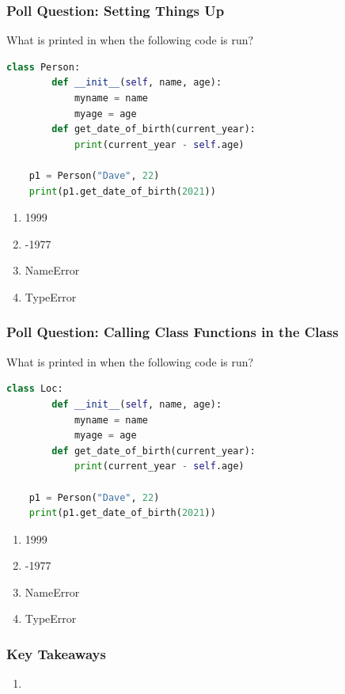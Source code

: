 \documentclass{beamer}
\begin{document}
%
%
\begin{frame}[fragile]
    \frametitle{Poll Question: Setting Things Up}
    What is printed in when the following code is run?
    \begin{lstlisting}[language=Python, autogobble]
    class Person:
        def __init__(self, name, age):
            myname = name
            myage = age
        def get_date_of_birth(current_year):
            print(current_year - self.age)

    p1 = Person("Dave", 22)
    print(p1.get_date_of_birth(2021))
    \end{lstlisting}
    \vfill
    \begin{enumerate}[A]
        \item 1999
        \item -1977
        \item NameError
        \item TypeError
    \end{enumerate}
\end{frame}

%
%
\begin{frame}[fragile]
    \frametitle{Poll Question: Calling Class Functions in the Class}
    What is printed in when the following code is run?
    \begin{lstlisting}[language=Python, autogobble]
    class Loc:
        def __init__(self, name, age):
            myname = name
            myage = age
        def get_date_of_birth(current_year):
            print(current_year - self.age)

    p1 = Person("Dave", 22)
    print(p1.get_date_of_birth(2021))
    \end{lstlisting}
    \vfill
    \begin{enumerate}[A]
        \item 1999
        \item -1977
        \item NameError
        \item TypeError
    \end{enumerate}
\end{frame}

%
%
\begin{frame}[fragile]
    \frametitle{Key Takeaways}
    \begin{enumerate}[A]
        \item 
    \end{enumerate}
\end{frame}
\end{document}
